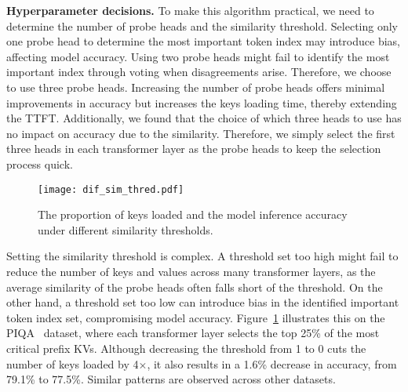 \noindent \textbf{Hyperparameter decisions.}
To make this algorithm practical, we need to determine the number of probe heads and the similarity threshold.
Selecting only one probe head to determine the most important token index may introduce bias, affecting model accuracy. Using two probe heads might fail to identify the most important index through voting when disagreements arise. Therefore, we choose to use three probe heads. Increasing the number of probe heads offers minimal improvements in accuracy but increases the keys loading time, thereby extending the TTFT.
Additionally, we found that the choice of which three heads to use has no impact on accuracy due to the similarity. 
Therefore, we simply select the first three heads in each transformer layer as the probe heads to keep the selection process quick.


\begin{figure}
	\centering
	\texttt{[image: dif\_sim\_thred.pdf]}
	\vspace{-0.1in}
	\caption{
		The proportion of keys loaded and the model inference accuracy under different similarity thresholds.}
	\label{fig:thred}
	\vspace{-0.1in}
\end{figure}



Setting the similarity threshold is complex. A threshold set too high might fail to reduce the number of keys and values across many transformer layers, as the average similarity of the probe heads often falls short of the threshold. On the other hand, a threshold set too low can introduce bias in the identified important token index set, compromising model accuracy.
Figure~\ref{fig:thred} illustrates this on the PIQA~\cite{lmeval} dataset, where each transformer layer selects the top 25\% of the most critical prefix KVs. Although decreasing the threshold from 1 to 0 cuts the number of keys loaded by 4$\times$, it also results in a 1.6\% decrease in accuracy, from 79.1\% to 77.5\%. Similar patterns are observed across other datasets.



